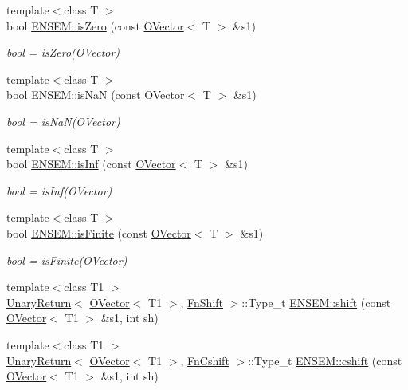 \begin{DoxyCompactItemize}
{\footnotesize template$<$class T $>$ }\\bool \mbox{\hyperlink{group__obsvector_gaba334c166dc76f5d8390574d1ea1a936}{E\+N\+S\+E\+M\+::is\+Zero}} (const \mbox{\hyperlink{classENSEM_1_1OVector}{O\+Vector}}$<$ T $>$ \&s1)
\begin{DoxyCompactList}\small\item\em bool = is\+Zero(\+O\+Vector) \end{DoxyCompactList}\item 
{\footnotesize template$<$class T $>$ }\\bool \mbox{\hyperlink{group__obsvector_ga2f554e602e9adc3c7d908a9f9518af6e}{E\+N\+S\+E\+M\+::is\+NaN}} (const \mbox{\hyperlink{classENSEM_1_1OVector}{O\+Vector}}$<$ T $>$ \&s1)
\begin{DoxyCompactList}\small\item\em bool = is\+Na\+N(\+O\+Vector) \end{DoxyCompactList}\item 
{\footnotesize template$<$class T $>$ }\\bool \mbox{\hyperlink{group__obsvector_ga4faba5244cb224511d1944e1cc99b2db}{E\+N\+S\+E\+M\+::is\+Inf}} (const \mbox{\hyperlink{classENSEM_1_1OVector}{O\+Vector}}$<$ T $>$ \&s1)
\begin{DoxyCompactList}\small\item\em bool = is\+Inf(\+O\+Vector) \end{DoxyCompactList}\item 
{\footnotesize template$<$class T $>$ }\\bool \mbox{\hyperlink{group__obsvector_ga4955ee051f997aca2666a9361dcb7861}{E\+N\+S\+E\+M\+::is\+Finite}} (const \mbox{\hyperlink{classENSEM_1_1OVector}{O\+Vector}}$<$ T $>$ \&s1)
\begin{DoxyCompactList}\small\item\em bool = is\+Finite(\+O\+Vector) \end{DoxyCompactList}\item 
{\footnotesize template$<$class T1 $>$ }\\\mbox{\hyperlink{structENSEM_1_1UnaryReturn}{Unary\+Return}}$<$ \mbox{\hyperlink{classENSEM_1_1OVector}{O\+Vector}}$<$ T1 $>$, \mbox{\hyperlink{structENSEM_1_1FnShift}{Fn\+Shift}} $>$\+::Type\+\_\+t \mbox{\hyperlink{group__obsvector_ga0f56d530ee90cdb061c1aeff65389a61}{E\+N\+S\+E\+M\+::shift}} (const \mbox{\hyperlink{classENSEM_1_1OVector}{O\+Vector}}$<$ T1 $>$ \&s1, int sh)
\item 
{\footnotesize template$<$class T1 $>$ }\\\mbox{\hyperlink{structENSEM_1_1UnaryReturn}{Unary\+Return}}$<$ \mbox{\hyperlink{classENSEM_1_1OVector}{O\+Vector}}$<$ T1 $>$, \mbox{\hyperlink{structENSEM_1_1FnCshift}{Fn\+Cshift}} $>$\+::Type\+\_\+t \mbox{\hyperlink{group__obsvector_ga62bf87c2f25855df9774ccd89281b555}{E\+N\+S\+E\+M\+::cshift}} (const \mbox{\hyperlink{classENSEM_1_1OVector}{O\+Vector}}$<$ T1 $>$ \&s1, int sh)

\end{DoxyCompactItemize}
